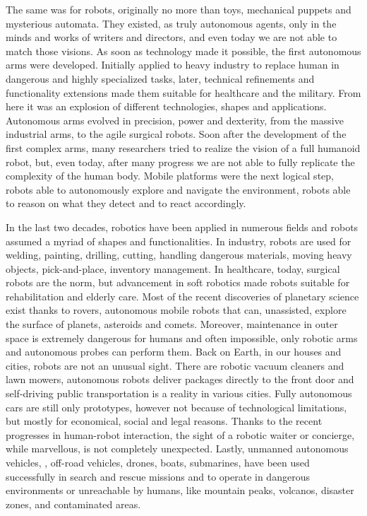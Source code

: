 The same was for robots, originally no more than toys, mechanical puppets and mysterious automata. They existed, as truly autonomous agents, only in the minds and works of writers and directors, and even today we are not able to match those visions. As soon as technology made it possible, the first autonomous arms were developed. Initially applied to heavy industry to replace human in dangerous and highly specialized tasks, later, technical refinements and functionality extensions made them suitable for healthcare and the military. From here it was an explosion of different technologies, shapes and applications. Autonomous arms evolved in precision, power and dexterity,  from the massive industrial arms, to the agile surgical robots.  Soon after the development of the first complex arms, many researchers tried to realize the vision of a full humanoid robot, but, even today, after many progress we are not able to fully replicate the complexity of the human body. Mobile platforms were the next logical step, robots able to autonomously explore and navigate the environment, robots able to reason on what they detect and to react accordingly.

In the last two decades, robotics have been applied in numerous fields and robots assumed a myriad of shapes and functionalities. In industry, robots are used for welding, painting, drilling, cutting, handling dangerous materials, moving heavy objects, pick-and-place, inventory management. In healthcare, today, surgical robots are the norm, but advancement in soft robotics made robots suitable for rehabilitation and elderly care. Most of the recent discoveries of planetary science exist thanks to rovers, autonomous mobile robots that can, unassisted, explore the surface of planets, asteroids and comets. Moreover, maintenance in outer space is extremely dangerous for humans and often impossible, only robotic arms and autonomous probes can perform them. Back on Earth, in our houses and cities, robots are not an unusual sight. There are robotic vacuum cleaners and lawn mowers,  autonomous robots deliver packages directly to the front door and self-driving public transportation is a reality in various cities. Fully autonomous cars are still only prototypes, however not because of technological limitations, but mostly for economical, social and legal reasons. Thanks to the recent progresses in human-robot interaction, the sight of a robotic waiter or concierge, while marvellous, is not completely unexpected. Lastly, unmanned autonomous vehicles, \eg, off-road vehicles, drones, boats, submarines,  have been used successfully in search and rescue missions and to operate in dangerous environments or unreachable by humans, like mountain peaks, volcanos, disaster zones, and contaminated areas.

